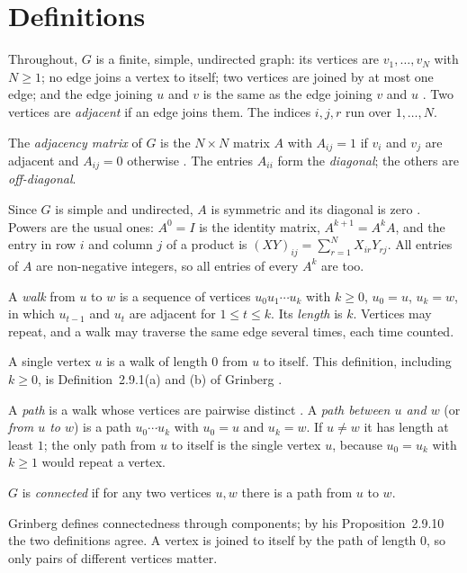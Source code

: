 \section{Definitions}\label{sec:defs}

Throughout, $G$ is a finite, simple, undirected graph: its vertices are $v_1,\dots,v_N$ with $N\ge 1$; no edge joins a vertex to itself; two vertices are joined by at most one edge; and the edge joining $u$ and $v$ is the same as the edge joining $v$ and $u$ \cite[Definition~2.1.1, p.~9]{grinberg2025graph}. Two vertices are \emph{adjacent} if an edge joins them. The indices $i,j,r$ run over $1,\dots,N$.

\begin{definition}\label{def:matrix}
The \emph{adjacency matrix} of $G$ is the $N\times N$ matrix $A$ with $A_{ij}=1$ if $v_i$ and $v_j$ are adjacent and $A_{ij}=0$ otherwise \cite[Definition~1.1.2]{galwaynotes}. The entries $A_{ii}$ form the \emph{diagonal}; the others are \emph{off-diagonal}.
\end{definition}
Since $G$ is simple and undirected, $A$ is symmetric and its diagonal is zero \cite[p.~3]{galwaynotes}. Powers are the usual ones: $A^0=I$ is the identity matrix, $A^{k+1}=A^kA$, and the entry in row $i$ and column $j$ of a product is $(XY)_{ij}=\sum_{r=1}^{N}X_{ir}Y_{rj}$. All entries of $A$ are non-negative integers, so all entries of every $A^k$ are too.

\begin{definition}\label{def:walk}
A \emph{walk} from $u$ to $w$ is a sequence of vertices $u_0u_1\cdots u_k$ with $k\ge 0$, $u_0=u$, $u_k=w$, in which $u_{t-1}$ and $u_t$ are adjacent for $1\le t\le k$. Its \emph{length} is $k$. Vertices may repeat, and a walk may traverse the same edge several times, each time counted.
\end{definition}
A single vertex $u$ is a walk of length $0$ from $u$ to itself. This definition, including $k\ge0$, is Definition~2.9.1(a) and (b) of Grinberg \cite[p.~36]{grinberg2025graph}.

\begin{definition}\label{def:path}
A \emph{path} is a walk whose vertices are pairwise distinct \cite[Definition~2.9.1(c), p.~36]{grinberg2025graph}. A \emph{path between $u$ and $w$} (or \emph{from $u$ to $w$}) is a path $u_0\cdots u_k$ with $u_0=u$ and $u_k=w$. If $u\ne w$ it has length at least $1$; the only path from $u$ to itself is the single vertex $u$, because $u_0=u_k$ with $k\ge1$ would repeat a vertex.
\end{definition}

\begin{definition}[Connected]\label{def:connected}
$G$ is \emph{connected} if for any two vertices $u,w$ there is a path from $u$ to $w$.
\end{definition}
Grinberg defines connectedness through components; by his Proposition~2.9.10 \cite[p.~42]{grinberg2025graph} the two definitions agree. A vertex is joined to itself by the path of length $0$, so only pairs of different vertices matter.
